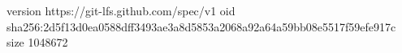 version https://git-lfs.github.com/spec/v1
oid sha256:2d5f13d0ea0588dff3493ae3a8d5853a2068a92a64a59bb08e5517f59efe917c
size 1048672
